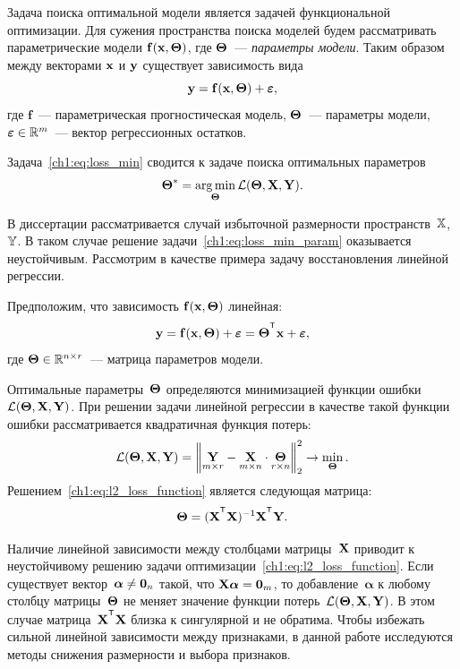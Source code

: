 Задача поиска оптимальной модели является задачей функциональной оптимизации. 
Для сужения пространства поиска моделей будем рассматривать параметрические модели $\mathbf{f}(\mathbf{x}, \boldsymbol{\Theta})$, где $\boldsymbol{\Theta}$~--- \textit{параметры модели}. 
Таким образом между векторами $\mathbf{x}$ и $\mathbf{y}$ существует зависимость вида
\begin{equation}
	\mathbf{y} = \mathbf{f}(\mathbf{x}, \boldsymbol{\Theta}) + \boldsymbol{\varepsilon},
	\label{ch1:eq:reg_model}
\end{equation}
где $\mathbf{f}$~--- параметрическая прогностическая модель, $\boldsymbol{\Theta}$~--- параметры модели, $\boldsymbol{\varepsilon} \in \mathbb{R}^{m}$~--- вектор регрессионных остатков. 

Задача~\eqref{ch1:eq:loss_min} сводится к задаче поиска оптимальных параметров
\begin{equation}
	\boldsymbol{\Theta}^* = \mathop{\arg \min}\limits_{\boldsymbol{\Theta}} \mathcal{L}(\boldsymbol{\Theta}, \mathbf{X}, \mathbf{Y}).
	\label{ch1:eq:loss_min_param}
\end{equation}

В диссертации рассматривается случай избыточной размерности пространств~$\mathbb{X}$, $\mathbb{Y}$. 
В таком случае решение задачи~\eqref{ch1:eq:loss_min_param} оказывается неустойчивым. 
Рассмотрим в качестве примера задачу восстановления линейной регрессии.

Предположим, что зависимость $\mathbf{f}(\mathbf{x}, \boldsymbol{\Theta})$ линейная:
\begin{equation}
	\by = \mathbf{f}(\bx, \bTheta) + \bepsilon = \bTheta^{\T} \bx+ \bepsilon,
	\label{ch1:eq:lin_reg_model}
\end{equation}
где $\boldsymbol{\Theta} \in \mathbb{R}^{n \times r}$~--- матрица параметров модели.

Оптимальные параметры~$\boldsymbol{\Theta}$ определяются минимизацией функции ошибки $\mathcal{L}(\boldsymbol{\Theta}, \mathbf{X}, \mathbf{Y})$.
При решении задачи линейной регрессии в качестве такой функции ошибки рассматривается квадратичная функция потерь:
\begin{equation}
	\mathcal{L}(\boldsymbol{\Theta}, \mathbf{X}, \mathbf{Y}) = {\left\| \underset{m \times r}{\mathbf{Y}}  - \underset{m \times n}{\mathbf{X}} \cdot \underset{r \times n}{\boldsymbol{\Theta}} \right\| }_2^2 \rightarrow\min_{\boldsymbol{\Theta}}.
	\label{ch1:eq:l2_loss_function}
\end{equation}
Решением~\eqref{ch1:eq:l2_loss_function} является следующая матрица:
\begin{equation*}
	\bTheta = (\bX^{\T} \bX)^{-1} \bX^{\T} \bY.
\end{equation*}

Наличие линейной зависимости между столбцами матрицы~$\mathbf{X}$ приводит к неустойчивому решению задачи оптимизации~\eqref{ch1:eq:l2_loss_function}.
Если существует вектор~$\boldsymbol{\alpha} \neq \boldsymbol{0}_n$ такой, что $\mathbf{X} \boldsymbol{\alpha}= \boldsymbol{0}_m$, то добавление~$\boldsymbol{\alpha}$ к любому столбцу матрицы~$\boldsymbol{\Theta}$ не меняет значение функции потерь~$\mathcal{L}(\boldsymbol{\Theta}, \mathbf{X}, \mathbf{Y})$.
В этом случае матрица~$\bX^{\T} \bX$ близка к сингулярной и не обратима.
Чтобы избежать сильной линейной зависимости между признаками, в данной работе исследуются методы снижения размерности и выбора признаков.


